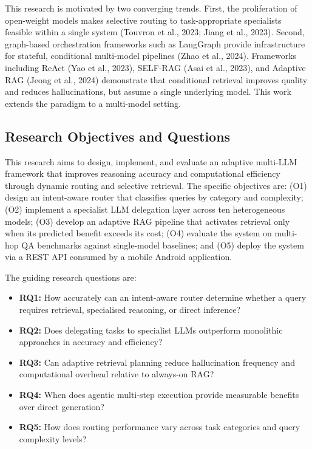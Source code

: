 \documentclass[12pt,a4paper]{article}
\begin{document}
This research is motivated by two converging trends. First, the proliferation of open-weight models makes selective routing to task-appropriate specialists feasible within a single system (Touvron et al., 2023; Jiang et al., 2023). Second, graph-based orchestration frameworks such as LangGraph provide infrastructure for stateful, conditional multi-model pipelines (Zhao et al., 2024). Frameworks including ReAct (Yao et al., 2023), SELF-RAG (Asai et al., 2023), and Adaptive RAG (Jeong et al., 2024) demonstrate that conditional retrieval improves quality and reduces hallucinations, but assume a single underlying model. This work extends the paradigm to a multi-model setting.

\subsection{Research Objectives and Questions}
\label{subsec:objectives}

This research aims to design, implement, and evaluate an adaptive multi-LLM framework that improves reasoning accuracy and computational efficiency through dynamic routing and selective retrieval. The specific objectives are: (O1) design an intent-aware router that classifies queries by category and complexity; (O2) implement a specialist LLM delegation layer across ten heterogeneous models; (O3) develop an adaptive RAG pipeline that activates retrieval only when its predicted benefit exceeds its cost; (O4) evaluate the system on multi-hop QA benchmarks against single-model baselines; and (O5) deploy the system via a REST API consumed by a mobile Android application.

The guiding research questions are:
\begin{itemize}
    \item \textbf{RQ1:} How accurately can an intent-aware router determine whether a query requires retrieval, specialised reasoning, or direct inference?
    \item \textbf{RQ2:} Does delegating tasks to specialist LLMs outperform monolithic approaches in accuracy and efficiency?
    \item \textbf{RQ3:} Can adaptive retrieval planning reduce hallucination frequency and computational overhead relative to always-on RAG?
    \item \textbf{RQ4:} When does agentic multi-step execution provide measurable benefits over direct generation?
    \item \textbf{RQ5:} How does routing performance vary across task categories and query complexity levels?
\end{itemize}
\end{document}
